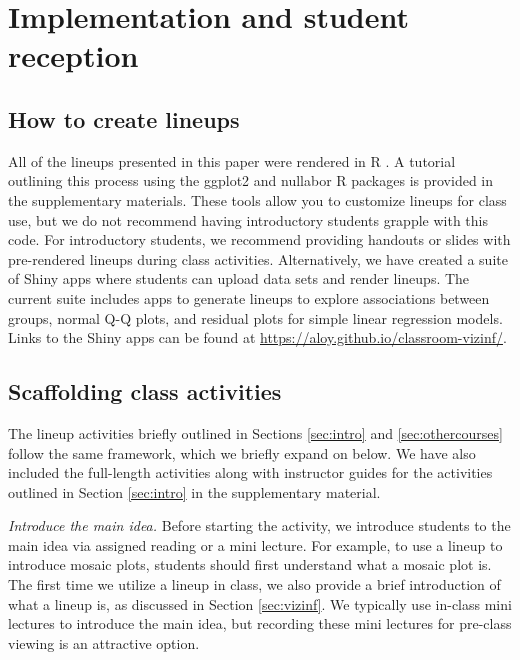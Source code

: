 \documentclass[12pt]{article}
\begin{document}
\hypertarget{implementation-and-student-reception}{%
\section{Implementation and student
reception}\label{implementation-and-student-reception}}

\label{sec:implement}

\hypertarget{how-to-create-lineups}{%
\subsection{How to create lineups}\label{how-to-create-lineups}}

All of the lineups presented in this paper were rendered in R \citep{r}.
A tutorial outlining this process using the ggplot2 \citep{ggplot2} and
nullabor \citep{nullabor} R packages is provided in the supplementary
materials. These tools allow you to customize lineups for class use, but
we do not recommend having introductory students grapple with this code.
For introductory students, we recommend providing handouts or slides
with pre-rendered lineups during class activities. Alternatively, we
have created a suite of Shiny apps \citep{shiny} where students can
upload data sets and render lineups. The current suite includes apps to
generate lineups to explore associations between groups, normal Q-Q
plots, and residual plots for simple linear regression models. Links to
the Shiny apps can be found at
\url{https://aloy.github.io/classroom-vizinf/}.

\hypertarget{scaffolding-class-activities}{%
\subsection{Scaffolding class
activities}\label{scaffolding-class-activities}}

The lineup activities briefly outlined in Sections \ref{sec:intro} and
\ref{sec:othercourses} follow the same framework, which we briefly
expand on below. We have also included the full-length activities along
with instructor guides for the activities outlined in Section
\ref{sec:intro} in the supplementary material.

\emph{Introduce the main idea.} Before starting the activity, we
introduce students to the main idea via assigned reading or a mini
lecture. For example, to use a lineup to introduce mosaic plots,
students should first understand what a mosaic plot is. The first time
we utilize a lineup in class, we also provide a brief introduction of
what a lineup is, as discussed in Section \ref{sec:vizinf}. We typically
use in-class mini lectures to introduce the main idea, but recording
these mini lectures for pre-class viewing is an attractive option.
\end{document}
